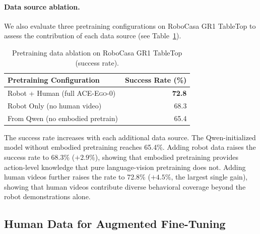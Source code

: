 \documentclass{article}
\newcommand{\OURS}{\textsc{ACE-Ego-0}\xspace}
\newcommand{\Ours}{\OURS}
\begin{document}
\paragraph{Data source ablation.}
We also evaluate three pretraining configurations on RoboCasa GR1 TableTop to assess the contribution of each data source (see Table~\ref{tab:human_scaling}).

\begin{table}[h]
  \centering
  \small
  \caption{Pretraining data ablation on RoboCasa GR1 TableTop (success rate).}
  \label{tab:human_scaling}
  \begin{tabular}{p{}r}
    \toprule
    Pretraining Configuration & Success Rate (\%) \\
    \midrule
    Robot + Human (full \Ours)          & \textbf{72.8} \\
    Robot Only (no human video)         & 68.3 \\
    From Qwen (no embodied pretrain)    & 65.4 \\
    \bottomrule
  \end{tabular}
\end{table}

The success rate increases with each additional data source.
The Qwen-initialized model without embodied pretraining reaches 65.4\%.
Adding robot data raises the success rate to 68.3\% ($+2.9\%$), showing that embodied pretraining provides action-level knowledge that pure language-vision pretraining does not.
Adding human videos further raises the rate to 72.8\% ($+4.5\%$, the largest single gain), showing that human videos contribute diverse behavioral coverage beyond the robot demonstrations alone.



\subsection{Human Data for Augmented Fine-Tuning}
\label{sec:human-mid-training}
\end{document}
